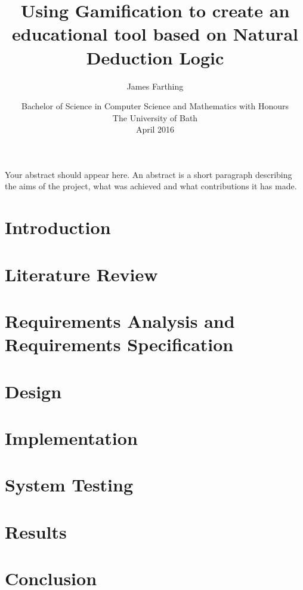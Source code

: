 \documentclass[11pt,openright,a4paper]{report}
\title{Using Gamification to create an educational tool based on Natural Deduction Logic}
\author{James Farthing}
\date{Bachelor of Science in Computer Science and Mathematics with Honours\\The University of Bath\\April 2016}
\begin{document}
 
\newpage

\abstract
Your abstract should appear here.  An abstract is a short
paragraph describing the aims of the project, what was
achieved and what contributions it has made.
\newpage

\maketitle
\newpage
\tableofcontents
\newpage
 
\chapter{Introduction}
	
\chapter{Literature Review}
	
\chapter{Requirements Analysis and Requirements Specification}
	
\chapter{Design}
	
\chapter{Implementation}
\chapter{System Testing}
\chapter{Results}
\chapter{Conclusion}
 
\newpage

\end{document}
